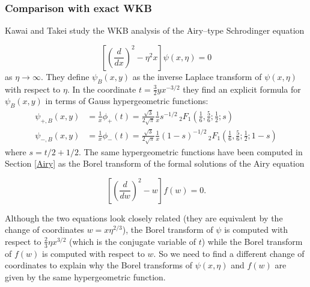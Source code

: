 \documentclass{article}
\theoremstyle{definition}
\theoremstyle{plain}
\begin{document}
\subsubsection{Comparison with exact WKB}

Kawai and Takei study the WKB analysis of the Airy--type Schrodinger equation

\begin{equation}
\label{WKB_Airy} 
\left[\left(\frac{d}{dx}\right)^2 - \eta^2 x \right] \psi(x, \eta) = 0 
\end{equation}
as $\eta\to\infty$. They define $\psi_B(x, y)$ as the inverse Laplace transform of $\psi(x, \eta)$ with respect to $\eta$. In the coordinate $t=\frac{3}{2}yx^{-3/2}$ they find an explicit formula for $\psi_B(x,y)$ in terms of Gauss hypergeometric functions:
\begin{align*}
\psi_{+,B}(x,y)&=\frac{1}{x}\phi_+(t)=\frac{\sqrt{3}}{2\sqrt{\pi}}\frac{1}{x}s^{-1/2}\, {}_2F_1\left(\frac{1}{6},\frac{5}{6};\frac{1}{2};s\right)\\
\psi_{-,B}(x,y)&=\frac{1}{x}\phi_-(t)=\frac{\sqrt{3}}{2\sqrt{\pi}}\frac{1}{x}(1-s)^{-1/2}\, {}_2F_1\left(\frac{1}{6},\frac{5}{6};\frac{1}{2};1-s\right)
\end{align*}
where $s=t/2+1/2$. 
The same hypergeometric functions have been computed in Section \ref{Airy} as the Borel transform of the formal solutions of the Airy equation

\begin{equation}
\label{Airy}
\left[\left(\frac{d}{dw}\right)^2 -  w \right] f(w) = 0.
\end{equation}

Although the two equations look closely related (they are equivalent by the change of coordinates $w=x\eta^{2/3}$), the Borel transform of $\psi$ is computed with respect to $\frac{2}{3}\eta x^{3/2}$ (which is the conjugate variable of $t$) while the Borel transform of $f(w)$ is computed with respect to $w$. So we need to find a different change of coordinates to explain why the Borel transforms of $\psi(x,\eta)$ and $f(w)$ are given by the same hypergeometric function. 
\end{document}
